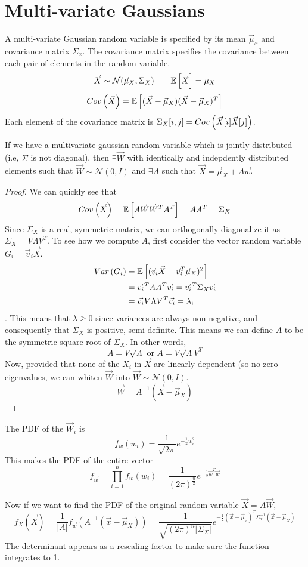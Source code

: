 \section{Multi-variate Gaussians}
A multi-variate Gaussian random variable is specified by its mean $\vec{\mu}_x$ and covariance matrix $\Sigma_x$. The covariance matrix specifies the covariance between each pair of elements in the random variable.
\[\vec{X}\sim\mathcal{N}(\vec{\mu}_X, \Sigma_X) \qquad \mathbb{E}\left[\vec{X}\right] = \mu_{X}\]
\[Cov\left(\vec{X}\right) = \mathbb{E}\left[(\vec{X}-\vec{\mu}_X)(\vec{X}-\vec{\mu}_X)^T\right]\]
Each element of the covariance matrix is $\Sigma_X[i, j] = Cov\left(\vec{X}[i]\vec{X}[j]\right)$.
\begin{theorem}
  If we have a multivariate gaussian random variable which is jointly distributed (i.e, $\Sigma$ is not diagonal), then $\exists \vec{W}$ with identically and indepdently distributed elements such that $\vec{W}\sim\mathcal{N}(0, I)$ and $\exists A$ such that $\vec{X} = \vec{\mu}_X+A\vec{w}$.
  \label{thm:mvn}
\end{theorem}
\begin{proof}
We can quickly see that
$$Cov\left(\vec{X}\right)=\mathbb{E}\left[A\vec{W}\vec{W}^TA^T\right] = AA^T=\Sigma_X$$
Since $\Sigma_X$ is a real, symmetric matrix, we can orthogonally diagonalize it as $\Sigma_X = V\Lambda V^T$. To see how we compute $A$, first consider the vector random variable $G_i=\vec{v}_i\vec{X}$.
\begin{align*}
  Var\left(G_i\right) &= \mathbb{E}\left[(\vec{v}_i\vec{X}-\vec{v}_i^T\vec{\mu}_X)^2\right] \\
  &= \vec{v_i}^TAA^T\vec{v_i} =\vec{v_i}^T\Sigma_X\vec{v_i}\\
  &= \vec{v_i}V\Lambda V^T\vec{v_i} = \lambda_i
\end{align*}.
This means that $\lambda \geq 0$ since variances are always non-negative, and consequently that $\Sigma_X$ is positive, semi-definite. This means we can define $A$ to be the symmetric square root of $\Sigma_X$. In other words,
\[
  A = V\sqrt{\Lambda} \text{ or } A = V\sqrt{\Lambda}V^T
\]
Now, provided that none of the $X_i$ in $\vec{X}$ are linearly dependent (so no zero eigenvalues, we can whiten $\vec{W}$ into $\vec{W}\sim\mathcal{N}(0, I)$.
\[
  \vec{W} = A^{-1}(\vec{X}-\vec{\mu}_X)
\]
\end{proof}
The PDF of the $\vec{W}_i$ is 
\[
  f_{w}(w_i)=\frac{1}{\sqrt{2\pi}}e^{-\frac{1}{2}w_i^2}
\]
This makes the PDF of the entire vector
\[
  f_{\vec{w}} = \prod_{i=1}^nf_w(w_i) = \frac{1}{(2\pi)^{\frac{n}{2}}}e^{-\frac{1}{2}\vec{w}^T\vec{w}}
\]

Now if we want to find the PDF of the original random variable $\vec{X} = A\vec{W}$,
\[
  f_{X}(\vec{X}) = \frac{1}{|A|}f_{\vec{w}}(A^{-1}(\vec{x}-\vec{\mu}_X)) = \frac{1}{\sqrt{(2\pi)^n|\Sigma_X|}}e^{-\frac{1}{2}(\vec{x}-\vec{\mu}_x)^T\Sigma_x^{-1}(\vec{x}-\vec{\mu}_X)}
\]
The determinant appears as a rescaling factor to make sure the function integrates to 1.

